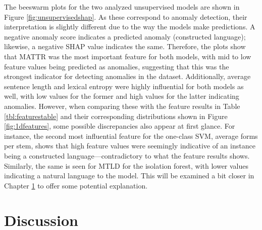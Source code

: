 \documentclass[12pt,a4paper]{article}
\numberwithin{figure}{section}
\numberwithin{table}{section}
\numberwithin{definition}{section}
\begin{document}
The beeswarm plots for the two analyzed unsupervised models are shown in Figure \ref{fig:unsupervisedshap}. As these correspond to anomaly detection, their interpretation is slightly different due to the way the models make predictions. A negative anomaly score indicates a predicted anomaly (constructed language); likewise, a negative SHAP value indicates the same. Therefore, the plots show that MATTR was the most important feature for both models, with mid to low feature values being predicted as anomalies, suggesting that this was the strongest indicator for detecting anomalies in the dataset. Additionally, average sentence length and lexical entropy were highly influential for both models as well, with low values for the former and high values for the latter indicating anomalies. However, when comparing these with the feature results in Table \ref{tbl:featurestable} and their corresponding distributions shown in Figure \ref{fig:1dfeatures}, some possible discrepancies also appear at first glance. For instance, the second most influential feature for the one-class SVM, average forms per stem, shows that high feature values were seemingly indicative of an instance being a constructed language---contradictory to what the feature results shows. Similarly, the same is seen for MTLD for the isolation forest, with lower values indicating a natural language to the model. This will be examined a bit closer in Chapter \ref{sec:discussion} to offer some potential explanation.



\clearpage
\newpage
\section{Discussion}
\label{sec:discussion}
\end{document}
